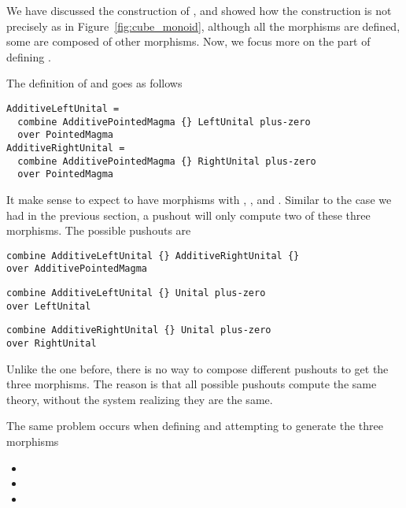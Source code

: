 We have discussed the construction of , and showed how the construction is not precisely as in Figure~\ref{fig:cube_monoid}, although all the morphisms are defined, some are composed of other morphisms. Now, we focus more on the part of defining . 

The definition of  and  goes as follows 
\begin{lstlisting}
AdditiveLeftUnital = 
  combine AdditivePointedMagma {} LeftUnital plus-zero 
  over PointedMagma
AdditiveRightUnital = 
  combine AdditivePointedMagma {} RightUnital plus-zero 
  over PointedMagma
\end{lstlisting} 
It make sense to expect  to have morphisms with , , and . Similar to the case we had in the previous section, a pushout will only compute two of these three morphisms. The possible pushouts are 
\begin{lstlisting}
combine AdditiveLeftUnital {} AdditiveRightUnital {} 
over AdditivePointedMagma
\end{lstlisting}

\begin{lstlisting}
combine AdditiveLeftUnital {} Unital plus-zero 
over LeftUnital 
\end{lstlisting}

\begin{lstlisting}
combine AdditiveRightUnital {} Unital plus-zero 
over RightUnital 
\end{lstlisting}

Unlike the one before, there is no way to compose different pushouts to get the three morphisms. The reason is that all possible pushouts compute the same theory, without the system realizing they are the same. 

The same problem occurs when defining  and attempting to generate the three morphisms 
\begin{itemize}
    \item {}
    \item {}
    \item {}
\end{itemize}


